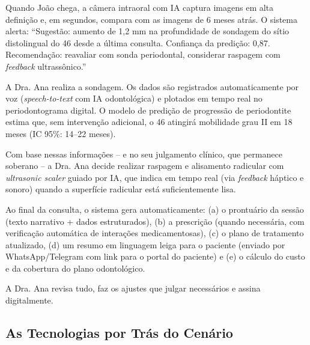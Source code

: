 Quando João chega, a câmera intraoral com IA captura imagens em alta definição
e, em segundos, compara com as imagens de 6 meses atrás. O sistema alerta:
``Sugestão: aumento de 1,2 mm na profundidade de sondagem do sítio distolingual
do 46 desde a última consulta. Confiança da predição: 0,87. Recomendação:
reavaliar com sonda periodontal, considerar raspagem com \textit{feedback}
ultrassônico.''

A Dra. Ana realiza a sondagem. Os dados são registrados automaticamente por voz
(\textit{speech-to-text} com IA odontológica) e plotados em tempo real no
periodontograma digital. O modelo de predição de progressão de periodontite
estima que, sem intervenção adicional, o 46 atingirá mobilidade grau II em 18
meses (IC 95\%: 14--22 meses).

Com base nessas informações -- e no seu julgamento clínico, que permanece
soberano -- a Dra. Ana decide realizar raspagem e alisamento radicular com
\textit{ultrasonic scaler} guiado por IA, que indica em tempo real (via
\textit{feedback} háptico e sonoro) quando a superfície radicular está
suficientemente lisa.

Ao final da consulta, o sistema gera automaticamente: (a) o prontuário da sessão
(texto narrativo + dados estruturados), (b) a prescrição (quando necessária,
com verificação automática de interações medicamentosas), (c) o plano de
tratamento atualizado, (d) um resumo em linguagem leiga para o paciente (enviado
por WhatsApp/Telegram com link para o portal do paciente) e (e) o cálculo do
custo e da cobertura do plano odontológico.

A Dra. Ana revisa tudo, faz os ajustes que julgar necessários e assina
digitalmente.

\subsection{As Tecnologias por Trás do Cenário}

